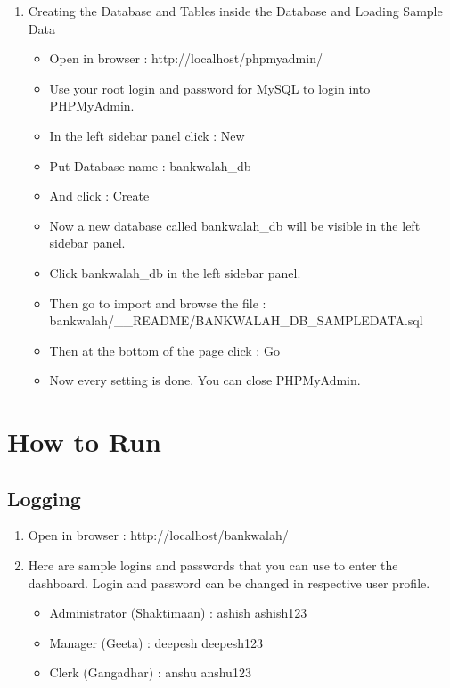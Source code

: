 \documentclass{article}
\begin{document}
\begin{enumerate}
 \item Creating the Database and Tables inside the Database and Loading Sample Data
 \begin{itemize}
 \item Open in browser : http://localhost/phpmyadmin/
 \item Use your root login and password for MySQL to login into PHPMyAdmin.
 \item In the left sidebar panel click : New
 \item Put Database name : bankwalah\_db
 \item And click : Create
 \item Now a new database called bankwalah\_db will be visible in the left sidebar panel.
 \item Click bankwalah\_db in the left sidebar panel.
 \item Then go to import and browse the file : bankwalah/\_\_README/BANKWALAH\_DB\_SAMPLEDATA.sql
 \item Then at the bottom of the page click : Go
 \item Now every setting is done. You can close PHPMyAdmin.
 \end{itemize}
 \end{enumerate}
 \pagebreak
 
 \section{How to Run}
 \subsection{Logging}
 \begin{enumerate}
 \item Open in browser : http://localhost/bankwalah/
 \item Here are sample logins and passwords that you can use to enter the dashboard. Login and password can be changed in respective user profile.
    \begin{itemize}
    \item Administrator (Shaktimaan) : ashish ashish123
    \item Manager (Geeta) : deepesh deepesh123
    \item Clerk (Gangadhar) : anshu anshu123
    \end{itemize}
 \end{enumerate}
 
\end{document}
